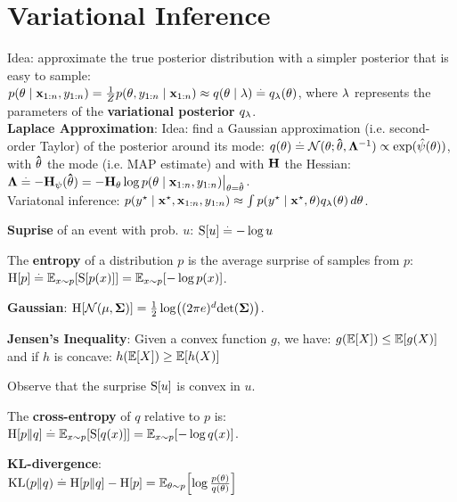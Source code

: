 \section{Variational Inference}
Idea: approximate the true posterior distribution with a simpler posterior that is easy to sample: \\$p(\mathbf{\theta} \mid \mathbf{x}_{1:n}, y_{1:n}) = \frac{1}{Z} p(\mathbf{\theta}, y_{1:n} \mid \mathbf{x}_{1:n}) \approx q(\mathbf{\theta} \mid \mathbf{\lambda}) \overset{.}{=} q_{\mathbf{\lambda}}(\mathbf{\theta})$, where $\mathbf{\lambda}$ represents the parameters of the \textbf{variational posterior} $q_{\mathbf{\lambda}}$.\\
\textbf{Laplace Approximation}: Idea: find a Gaussian approximation (i.e. second-order Taylor) of the posterior around its mode:
$q(\vtheta) \defeq \N[\vtheta]{\vthetahat}{\inv{\mLambda}} \propto \exp(\hat{\psi}(\vtheta))$, with $\mathbf{\hat{\theta}}$ the mode (i.e. MAP estimate) and with $\mathbf{H}$ the Hessian: $\mathbf{\Lambda} \overset{.}{=} - \mathbf{H}_\psi(\mathbf{\hat{\theta}}) = - \mathbf{H}_{\mathbf{\theta}} \log p(\mathbf{\theta} \mid \mathbf{x}_{1:n}, y_{1:n}) \bigl|_{\mathbf{\theta} = \mathbf{\hat{\theta}}}$. \\
Variatonal inference: $p(y^\star \mid \mathbf{x^\star}, \mathbf{x}_{1:n}, y_{1:n})  \approx \int p(y^\star \mid \mathbf{x^\star}, \mathbf{\theta}) q_{\mathbf{\lambda}}(\mathbf{\theta}) \,d\mathbf{\theta}$.
\begin{framed}
    \textbf{Suprise} of an event with prob. $u$: $\S{u} \defeq - \log u$
\end{framed}
\begin{framed}
    The \textbf{entropy} of a distribution $p$ is the average surprise of samples from $p$:\\
    $\H{p} \defeq \E[x \sim p]{\S{p(x)}} = \E[x \sim p]{- \log p(x)}$.
\end{framed}
\textbf{Gaussian}: $\H{\N{\vmu}{\mSigma}} = \frac{1}{2} \log \parentheses*{(2 \pi e)^d \det{\mSigma}}$.
\begin{framed}
    \textbf{Jensen's Inequality}: Given a convex function $g$, we have:
    $g(\E{X}) \leq \E{g(X)}$ and if $h$ is concave:  $h(\E{X}) \geq \E{h(X)}$
\end{framed}
Observe that the surprise $\S{u}$ is convex in $u$.
\begin{framed}
    The \textbf{cross-entropy} of $q$ relative to $p$ is: \\
    $\crH{p}{q} \defeq \E[x \sim p]{\S{q(x)}} = \E[x \sim p]{- \log q(x)}$.
\end{framed}
\begin{framed}
    \textbf{KL-divergence}: \\
    $\KL{p}{q} \defeq \crH{p}{q} - \H{p} = \E[\vtheta \sim p]{\log \frac{p(\vtheta)}{q(\vtheta)}}$
\end{framed}
